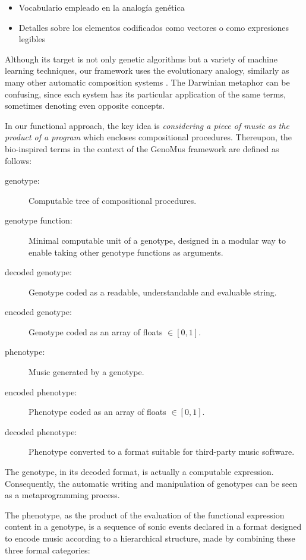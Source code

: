 \documentclass{article}
\begin{document}
{\color{gray}
\begin{itemize}
\item Vocabulario empleado en la analogía genética
\item Detalles sobre los elementos codificados como vectores o como expresiones legibles
\end{itemize}
}


Although its target is not only genetic algorithms but a variety of machine learning techniques, our framework uses the evolutionary analogy, similarly as many other automatic composition systems \cite{Sulyok2019, SnchezQuintana2013, add more...}. The Darwinian metaphor can be confusing, since each system has its particular application of the same terms, sometimes denoting even opposite concepts. 

In our functional approach, the key idea is \emph{considering a piece of music as the product of a program} which encloses compositional procedures. Thereupon, the bio-inspired terms in the context of the GenoMus framework are defined as follows: 


\begin{description}
\item[genotype:] Computable tree of compositional procedures.
\item[genotype function:] Minimal computable unit of a genotype, designed in a modular way to enable taking other genotype functions as arguments. 
\item[decoded genotype:] Genotype coded as a readable, understandable and evaluable string.
\item[encoded genotype:] Genotype coded as an array of floats $\in [0, 1]$.
\item[phenotype:] Music generated by a genotype.
\item[encoded phenotype:] Phenotype coded as an array of floats $\in [0, 1]$.
\item[decoded phenotype:] Phenotype converted to a format suitable for third-party music software.
\end{description}

The {genotype}, in its decoded format, is actually a computable expression. Consequently, the automatic writing and manipulation of genotypes can be seen as a metaprogramming process.

The {phenotype}, as the product of the evaluation of the functional expression content in a genotype, is a sequence of sonic events declared in a format designed to encode music according to a hierarchical structure, made by combining these three formal categories:
\end{document}
